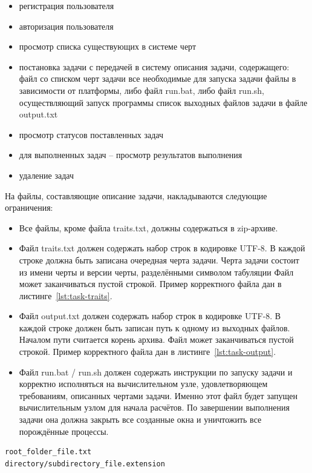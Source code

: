 \documentclass[a4paper,12pt]{report}
\numberwithin{equation}{section}
\begin{document}
\begin{itemize}
  \item регистрация пользователя
  \item авторизация пользователя
  \item просмотр списка существующих в системе черт
  \item постановка задачи с передачей в систему описания задачи, содержащего:
  \subitem файл со списком черт задачи
  \subitem все необходимые для запуска задачи файлы
  \subitem в зависимости от платформы, либо файл run.bat, либо файл run.sh, осуществляющий запуск программы
  \subitem список выходных файлов задачи в файле output.txt
  \item просмотр статусов поставленных задач
  \item для выполненных задач -- просмотр результатов выполнения
  \item удаление задач
\end{itemize}

На файлы, составляющие описание задачи, накладываются следующие ограничения:

\begin{itemize}
  \item Все файлы, кроме файла traits.txt, должны содержаться в zip-архиве.
  \item Файл traits.txt должен содержать набор строк в кодировке UTF-8.
  В каждой строке должна быть записана очередная черта задачи.
  Черта задачи состоит из имени черты и версии черты, разделёнными символом табуляции
  Файл может заканчиваться пустой строкой.
  Пример корректного файла дан в листинге~\ref{lst:task-traits}.
  \item Файл output.txt должен содержать набор строк в кодировке UTF-8.
  В каждой строке должен быть записан путь к одному из выходных файлов.
  Началом пути считается корень архива.
  Файл может заканчиваться пустой строкой.
  Пример корректного файла дан в листинге~\ref{lst:task-output}.
  \item Файл run.bat / run.sh должен содержать инструкции по запуску задачи и корректно исполняться на вычислительном узле, удовлетворяющем требованиям, описанных чертами задачи.
  Именно этот файл будет запущен вычислительным узлом для начала расчётов.
  По завершении выполнения задачи она должна закрыть все созданные окна и уничтожить все порождённые процессы.
\end{itemize}

\begin{lstlisting}[float={},language={},caption={Пример корректного файла со списком черт задачи},label=lst:task-traits]
root_folder_file.txt
directory/subdirectory_file.extension

\end{lstlisting}
\end{document}

